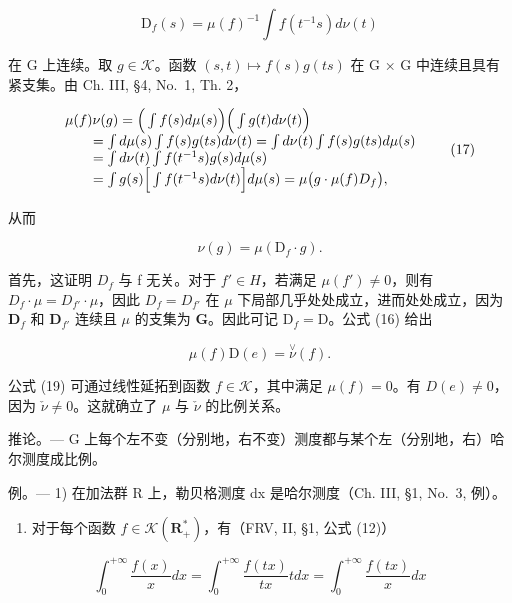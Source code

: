 \[
\mathrm{D} _ {f} (s) = \mu (f) ^ {- 1} \int f (t ^ {- 1} s) d \nu (t)\tag{16}
\]

在 G 上连续。取 \(g \in \mathcal{K}\)。函数 \((s, t) \mapsto f(s)g(ts)\) 在 G × G 中连续且具有紧支集。由 Ch. III, §4, No.~1, Th. 2，

\[
\begin{array}{r l} & {\mu (f) \nu (g) = \Big (\int f (s) d \mu (s) \Big) \Big (\int g (t) d \nu (t) \Big)} \\ & {\qquad = \int d \mu (s) \int f (s) g (t s) d \nu (t) = \int d \nu (t) \int f (s) g (t s) d \mu (s)} \\ & {\qquad = \int d \nu (t) \int f (t ^ {- 1} s) g (s) d \mu (s)} \\ & {\qquad = \int g (s) \Big [ \int f (t ^ {- 1} s) d \nu (t) \Big ] d \mu (s) = \mu \big (g \cdot \mu (f) D _ {f} \big),} \end{array}\tag{17}
\]

从而

\[
\nu (g) = \mu (\mathrm{D} _ {f} \cdot g).\tag{18}
\]

首先，这证明 \(D_{f}\) 与 f 无关。对于 \(f' \in H\)，若满足 \(\mu(f') \neq 0\)，则有 \(D_{f} \cdot \mu = D_{f'} \cdot \mu\)，因此 \(D_{f} = D_{f'}\) 在 \(\mu\) 下局部几乎处处成立，进而处处成立，因为 \(\mathbf{D}_f\) 和 \(\mathbf{D}_{f'}\) 连续且 \(\mu\) 的支集为 \(\mathbf{G}\)。因此可记 \(\mathrm{D}_f = \mathrm{D}\)。公式 (16) 给出

\[
\mu (f) \mathrm{D} (e) = \stackrel {\vee} {\nu} (f).\tag{19}
\]

公式 (19) 可通过线性延拓到函数 \(f \in \mathcal{K}\)，其中满足 \(\mu(f) = 0\)。有 \(D(e) \neq 0\)，因为 \(\check{\nu} \neq 0\)。这就确立了 \(\mu\) 与 \(\check{\nu}\) 的比例关系。

推论。--- G 上每个左不变（分别地，右不变）测度都与某个左（分别地，右）哈尔测度成比例。

例。--- 1) 在加法群 R 上，勒贝格测度 dx 是哈尔测度（Ch. III, §1, No.~3, 例）。

\begin{enumerate}
\def\labelenumi{\arabic{enumi})}
\setcounter{enumi}{1}
\tightlist
\item
   对于每个函数 \(f \in \mathcal{K}(\mathbf{R}_+^*)\)，有（FRV, II, §1, 公式 (12)）
\end{enumerate}

\[
\int_ {0} ^ {+ \infty} \frac {f (x)}{x} d x = \int_ {0} ^ {+ \infty} \frac {f (t x)}{t x} t d x = \int_ {0} ^ {+ \infty} \frac {f (t x)}{x} d x
\]

